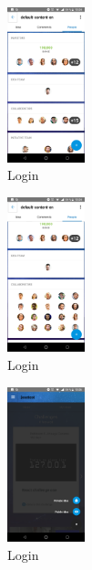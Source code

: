\begin{figure}[!h]
	\begin{center}
		\includegraphics[width=0.2\textwidth]{./img/anexo1/ver_idea_gente.png}
		\caption{Login}
		\label{fig:ver_idea_gente}
	\end{center}
\end{figure}

\begin{figure}[!h]
	\begin{center}
		\includegraphics[width=0.2\textwidth]{./img/anexo1/ver_idea_gente_expandido.png}
		\caption{Login}
		\label{fig:ver_idea_gente_expandido}
	\end{center}
\end{figure}

\begin{figure}[!h]
	\begin{center}
		\includegraphics[width=0.2\textwidth]{./img/anexo1/inicio_crear_idea.png}
		\caption{Login}
		\label{fig:inicio_crear_idea}
	\end{center}
\end{figure}

